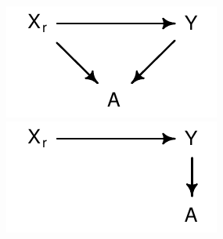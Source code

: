 \documentclass[a4paper]{tufte-book}\usepackage[]{graphicx}\usepackage[]{xcolor}
\begin{document}
\begin{figure}[tbp]
    \centering

    \begin{minipage}{0.45\textwidth}
        \centering
          \includegraphics[width = \textwidth]{figure/posttreatment1}
    \end{minipage}
    \hfill
    \begin{minipage}{0.45\textwidth}
        \centering
        \includegraphics[width = \textwidth]{figure/posttreatment2}
    \end{minipage}

    \vfill


\end{figure}
\end{document}
